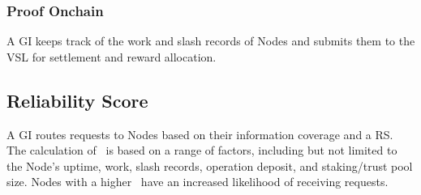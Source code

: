 \subsubsection{Proof Onchain} A GI keeps track of the work and slash records of \glspl{Node} and submits them to the \gls{VSL} for settlement and reward allocation.

\subsection{Reliability Score}

A \gls{GI} routes requests to \glspl{Node} based on their information coverage and a \gls{RS}.
The calculation of \reliabilityScore\ is based on a range of factors, including but not limited to the \gls{Node}'s uptime, work, slash records, operation deposit, and staking/trust pool size.
\glspl{Node} with a higher \reliabilityScore\ have an increased likelihood of receiving requests.
